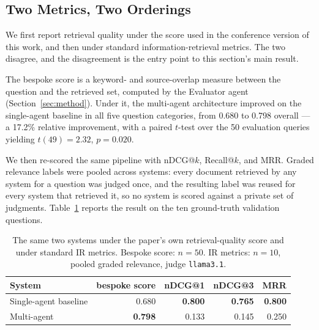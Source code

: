 
\subsection{Two Metrics, Two Orderings}\label{sec:two-metrics}

We first report retrieval quality under the score used in the conference
version of this work, and then under standard information-retrieval metrics.
The two disagree, and the disagreement is the entry point to this section's
main result.

The bespoke score is a keyword- and source-overlap measure between the question
and the retrieved set, computed by the Evaluator agent
(Section~\ref{sec:method}). Under it, the multi-agent architecture improved on
the single-agent baseline in all five question categories, from 0.680 to 0.798
overall --- a 17.2\% relative improvement, with a paired $t$-test over the 50
evaluation queries yielding $t(49)=2.32$, $p=0.020$.

We then re-scored the same pipeline with nDCG@$k$, Recall@$k$, and MRR. Graded
relevance labels were pooled across systems: every document retrieved by any
system for a question was judged once, and the resulting label was reused for
every system that retrieved it, so no system is scored against a private set of
judgments. Table~\ref{tab:inversion} reports the result on the ten
ground-truth validation questions.

\begin{table}[t]
\caption{The same two systems under the paper's own retrieval-quality score and
under standard IR metrics. Bespoke score: $n=50$. IR metrics: $n=10$, pooled
graded relevance, judge \texttt{llama3.1}.}
\label{tab:inversion}
\begin{tabular}{lrrrr}
\toprule
System & bespoke score & nDCG@1 & nDCG@3 & MRR \\
\midrule
Single-agent baseline & 0.680 & \textbf{0.800} & \textbf{0.765} & \textbf{0.800} \\
Multi-agent           & \textbf{0.798} & 0.133 & 0.145 & 0.250 \\
\bottomrule
\end{tabular}
\end{table}

